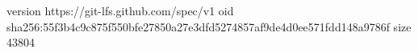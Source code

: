 version https://git-lfs.github.com/spec/v1
oid sha256:55f3b4c9c875f550bfe27850a27e3dfd5274857af9de4d0ee571fdd148a9786f
size 43804
